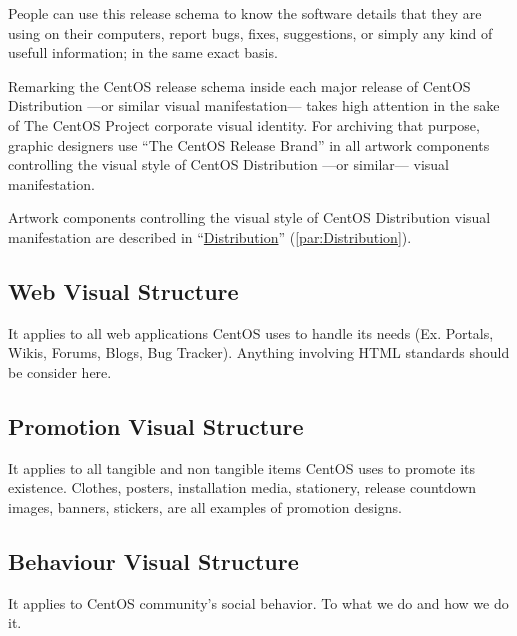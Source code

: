 People can use this release schema to know the software details that
they are using on their computers, report bugs, fixes, suggestions, or
simply any kind of usefull information; in the same exact basis.

Remarking the CentOS release schema inside each major release of
CentOS Distribution ---or similar visual manifestation--- takes high
attention in the sake of The CentOS Project corporate visual identity.
For archiving that purpose, graphic designers use ``The CentOS Release
Brand'' in all artwork components controlling the visual style of
CentOS Distribution ---or similar--- visual manifestation.

Artwork components controlling the visual style of CentOS Distribution
visual manifestation are described in
``\hyperlink{par:Distribution}{Distribution}''
(\autoref{par:Distribution}).

 \subsection{Web Visual Structure}
\hypertarget{sec:Concepts:Identity:Structure:Web}{}
      \label{sec:Concepts:Identity:Structure:Web}

It applies to all web applications CentOS uses to handle its needs
(Ex. Portals, Wikis, Forums, Blogs, Bug Tracker). Anything involving
HTML standards should be consider here.

 \subsection{Promotion Visual Structure}
\hypertarget{sec:Concepts:Identity:Structure:Promotion}{}
      \label{sec:Concepts:Identity:Structure:Promotion}

It applies to all tangible and non tangible items CentOS uses to
promote its existence. Clothes, posters, installation media,
stationery, release countdown images, banners, stickers, are all
examples of promotion designs.

 \subsection{Behaviour Visual Structure}
\hypertarget{sec:Concepts:Identity:Structure:Behaviour}{}
      \label{sec:Concepts:Identity:Structure:Behaviour}

It applies to CentOS community's social behavior. To what we do and
how we do it. 


